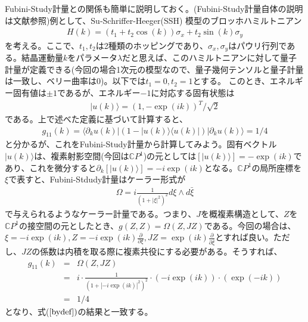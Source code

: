 \documentclass[12pt]{jsbook}
\newcommand{\la}{\langle}
\newcommand{\ra}{\rangle}
\newcommand{\pa}{\partial}
\begin{document}
Fubini-Study計量との関係も簡単に説明しておく。(Fubini-Study計量自体の説明は文献\cite{nakahara2018geometry}参照)例として、Su-Schriffer-Heeger(SSH) 模型のブロッホハミルトニアン\cite{asboth2016short}
\begin{eqnarray}
 H(k) = (t_1 + t_2 \cos(k))\sigma_x + t_2 \sin (k)\sigma_y
 \end{eqnarray}
 を考える。ここで、$t_1,t_2$は2種類のホッピングであり、$\sigma_x,\sigma_y$はパウリ行列である。結晶運動量$k$をパラメータ$\lambda$だと思えば、このハミルトニアンに対して量子計量が定義できる(今回の場合1次元の模型なので、量子幾何テンソルと量子計量は一致し、ベリー曲率は0)。以下では$t_1=0,t_2=1$とする。
 このとき、エネルギー固有値は$\pm 1$であるが、エネルギー$-1$に対応する固有状態は
 \begin{eqnarray}
     |u(k)\ra = (1,-\exp(ik))^{T}/\sqrt{2}
 \end{eqnarray}
 である。上で述べた定義に基づいて計算すると、
\begin{eqnarray}
\label{bydef}
g_{11}(k)=\la \pa_{k} u(k)|(1-|u(k)\ra\la u(k)|)|\pa_{k}u(k)\ra =1/4
\end{eqnarray}
と分かるが、これをFubini-Study計量から計算してみよう。固有ベクトル$|u(k)\ra$は、複素射影空間(今回は$\mathbb{C}P^1$)の元としては$[|u(k)\ra]=-\exp(ik)$であり、これを微分すると$\pa _k[|u(k)\ra]=-i\exp(ik)$となる。$\mathbb{C}P^1$の局所座標を$\xi$で表すと、Fubini-Stdudy計量はケーラー形式が
\begin{eqnarray}
\Omega = i \frac{1}{(1+|\xi|^2)^2}d\xi \wedge d \bar{\xi}
\end{eqnarray}
で与えられるようなケーラー計量である。つまり、$J$を概複素構造として、$Z$を$\mathbb{C}P^1$の接空間の元としたとき、$g(Z,Z)=\Omega(Z,JZ)$である。今回の場合は、
$ \xi = -i\exp(ik),Z = -i\exp(ik)\frac{\partial}{\partial \xi},JZ = \exp(ik)\frac{\partial}{\partial \bar{\xi}} $とすれば良い。ただし、$JZ$の係数は内積を取る際に複素共役にする必要がある。そうすれば、
\begin{eqnarray}
    g_{11}(k) &=&\Omega(Z,JZ) \\
    &=& i\cdot \frac{1}{(1+|-i\exp(ik)|^2)^2}\cdot (-i\exp(ik))\cdot(\exp(-ik))\\
    &=&1/4
\end{eqnarray}
となり、式($\ref{bydef})$の結果と一致する。
\end{document}
